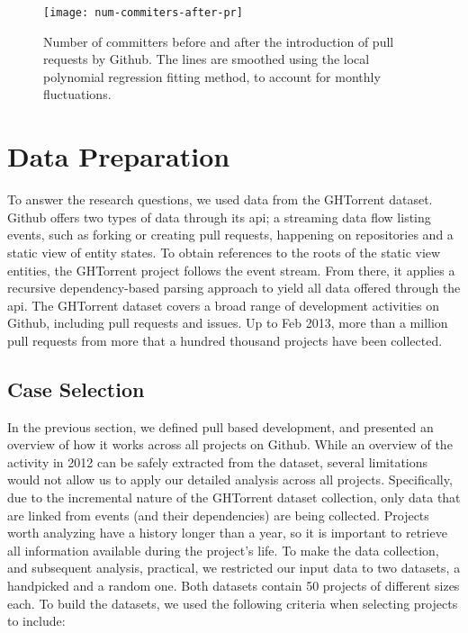 \documentclass{sig-alternate}
\begin{document}
\begin{figure}
  \begin{center}
    \texttt{[image: num-commiters-after-pr]}
  \end{center}
  \caption{Number of committers before and after the introduction of pull
  requests by Github. The lines are smoothed using the local polynomial
  regression fitting method, to account for monthly fluctuations.}
  \label{fig:before-after-pr}
\end{figure}

\section{Data Preparation}

To answer the research questions, we used data from the GHTorrent dataset.
Github offers two types of data through its {\sc api}; a streaming data flow
listing events, such as forking or creating pull requests, happening on
repositories and a static view of entity states. To obtain references to the
roots of the static view entities, the GHTorrent project follows the event
stream. From there, it applies a recursive dependency-based parsing approach to
yield all data offered through the {\sc api}. The GHTorrent dataset covers a
broad range of development activities on Github, including pull requests and
issues. Up to Feb 2013, more than a million pull requests from more that a
hundred thousand projects have been collected.

\subsection{Case Selection}
\label{sec:caseselection}
In the previous section, we defined pull based development, and presented an
overview of how it works across all projects on Github. While an overview of
the activity in 2012 can be safely extracted from the dataset, several
limitations would not allow us to apply our detailed analysis across all
projects. Specifically, due to the incremental nature of the GHTorrent dataset
collection, only data that are linked from events (and their dependencies) are
being collected. Projects worth analyzing have a history longer than a year, so
it is important to retrieve all information available during the project's
life. To make the data collection, and subsequent analysis, practical, we
restricted our input data to two datasets, a \textsf{handpicked} and a
\textsf{random} one. Both datasets contain 50 projects of different sizes
each. To build the datasets, we used the following criteria when selecting
projects to include:
\end{document}
